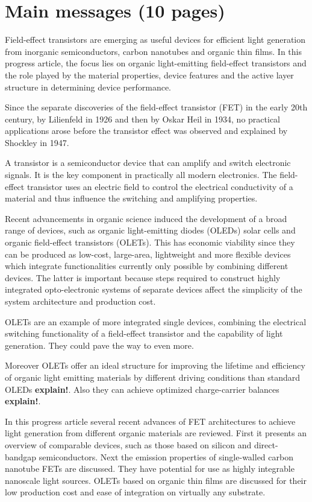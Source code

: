 \section{Main messages (10 pages)}

Field-effect transistors are emerging as useful devices for efficient light generation from inorganic semiconductors, carbon nanotubes and organic thin films. In this progress article, the focus lies on organic light-emitting field-effect transistors and the role played by the material properties, device features and the active layer structure in determining device performance.

Since the separate discoveries of the field-effect transistor (FET) in the early 20th century, by Lilienfeld in 1926 and then by Oskar Heil in 1934, no practical applications arose before the transistor effect was observed and explained by Shockley in 1947. %

A transistor is a semiconductor device that can amplify and switch electronic signals. It is the key component in practically all modern electronics. The field-effect transistor uses an electric field to control the electrical conductivity of a material and thus influence the switching and amplifying properties.

Recent advancements in organic science induced the development of a broad range of devices, such as organic light-emitting diodes (OLEDs) solar cells and organic field-effect transistors (OLETs). This has economic viability since they can be produced as low-cost, large-area, lightweight and more flexible devices which integrate functionalities currently only possible by combining different devices. The latter is important because steps required to construct highly integrated opto-electronic systems of separate devices affect the simplicity of the system architecture and production cost.

OLETs are an example of more integrated single devices, combining the electrical switching functionality of a field-effect transistor and the capability of light generation. They could pave the way to even more. 

Moreover OLETs offer an ideal structure for improving the lifetime and efficiency of organic light emitting materials by different driving conditions than standard OLEDs \textbf{explain!}. Also they can achieve optimized charge-carrier balances \textbf{explain!}.

In this progress article several recent advances of FET architectures to achieve light generation from different organic materials are reviewed. First it presents an overview of comparable devices, such as those based on silicon and direct-bandgap semiconductors. Next the emission properties of single-walled carbon nanotube FETs are discussed. They have potential for use as highly integrable nanoscale light sources. OLETs based on organic thin films are discussed for their low production cost and ease of integration on virtually any substrate. 
